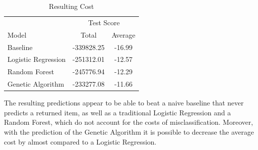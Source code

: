 \begin{table}
\centering
\caption{Resulting Cost}
\tiny
\begin{tabular}{lcc}
\toprule
                       & \multicolumn{2}{c}{Test Score }\\
\cmidrule(lr){2-3}                       
Model                  &    Total     &  Average \\
\midrule
Baseline               &  -339828.25  &  -16.99  \\
Logistic Regression    &  -251312.01  &  -12.57  \\
Random Forest          &  -245776.94  &  -12.29  \\
Genetic Algorithm      &  -233277.08  &  -11.66  \\
\bottomrule
\end{tabular}
\end{table}


The resulting predictions appear to be able to beat a naive baseline that never predicts a returned item, as well as a traditional Logistic Regression and a Random Forest, which do not account for the costs of misclassification. Moreover, with the prediction of the Genetic Algorithm it is possible to decrease the average cost by almost  compared to a Logistic Regression.